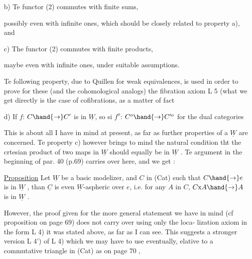 
 b) Te functor (2) commutes with finite sums,

possibly even with infinite ones, which should be closely related to
property a), and

 c) The functor (2) commutes with finite products,

\hand{(}maybe even with infinite ones, under suitable assumptions\hand{)}.

Te following property, due to Quillen for weak equivalences, is
used in order to prove for these (and the cohomological analogs) the
fibration axiom L 5 (what we get directly is the case of cofibrations,
as a matter of fact

 d) If $f$: $C\hand{\to} C'$ is in $\underline{W}$, so si $f^{o}$: $C^{o}\hand{\to} C'^{o}$ for the dual categories

This is about all I have in mind at present, as far as further
properties of a $\underline{W}$ are concerned. Te property c) however brings to 
mind the natural  condition tht the crtesian product of two maps in $\underline{W}$
should equally be in $\underline{W}$ . Te argument in the beginning of par. 40
(p.69) carries over here, and we get :

\uline{Proposition} Let $\underline{W}$ be a basic modelizer, and $C$ in (Cat) such that 
$C\hand{\to} e$ is in $\underline{W}$ , than $\underline{C}$ is even $\underline{W}$-aspheric over $e$, i.e. for any $A$ in
$C$, $C\mathrm{x}A\hand{\to} A$ is in $\underline{W}$ .

However, the proof given for the more general statement we have in
mind (cf proposition on page 69) does not carry over using only the loca-%
lization axiom in the form L 4) it was stated above, as far as I can
see. This suggests a  stronger version L 4') of L 4) which
we may have to use eventually, elative to a  commutative
triangle in (Cat) as on page 70
,

